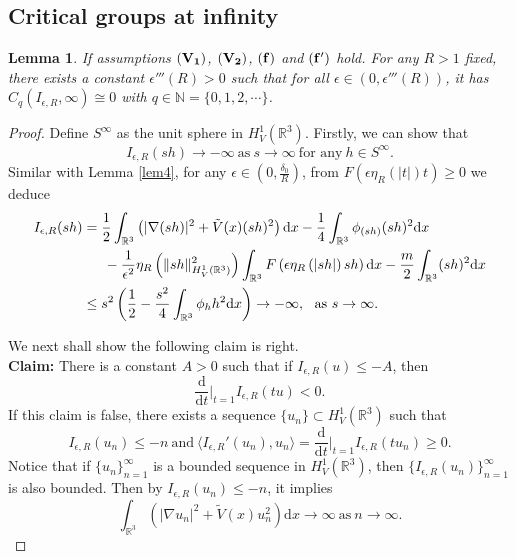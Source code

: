\documentclass[12pt]{amsart}
\numberwithin{equation}{section}
\newtheorem{lemma}[theorem]{Lemma}
\theoremstyle{definition}
\begin{document}
\subsection{Critical groups at infinity}
\begin{lemma}\label{lem6}
If assumptions ${\bf (V_1)}$, ${\bf (V_2)}$, ${\bf (f)}$ and ${\bf (f')}$ hold. For any $R>1$ fixed, there exists a constant $\epsilon'''(R)>0$ such that for all $\epsilon\in(0,\epsilon'''(R))$, it has $C_{q}(I_{\epsilon,R},\infty)\cong0$ with $q\in \mathbb{N}=\{0,1,2,\cdots\}$.
\end{lemma}
\begin{proof}
Define $S^{\infty}$ as the unit sphere in $H^{1}_{V}(\mathbb{R}^3)$. Firstly, we can show that
\begin{equation}\label{eq25}
I_{\epsilon,R}(sh)\to-\infty \ \mbox{as}\ s\to\infty \ \mbox{for any}\ h\in S^{\infty}.
\end{equation}
Similar with Lemma \ref{lem4}, for any $\epsilon\in (0,\frac{\delta_0}{R})$, from $F\left (\epsilon \eta _{R} \left ( \left | t\right |\right )t\right )\geq 0$ we deduce
\begin{equation*}
		\begin{split}
		I_{\epsilon,R}(sh)&=\frac{1}{2}\int_{\mathbb{R}^3}\left(|\nabla (sh)|^{2}+\tilde V(x)(sh)^{2}\right)\text{d}x-\frac{1}{4}\int_{\mathbb{R}^3}\phi_{(sh)}(sh)^{2}\text{d}x\\
		&\indent-\frac{1}{\epsilon^2}\eta _{R}\left (\|sh\|^{2}_{H^1_{V}(\mathbb{R}^3)}\right )\int_{\mathbb{R}^{3}}F\left (\epsilon \eta _{R} \left ( \left | sh\right |\right )sh\right )\text{d}x-\frac{m}{2}\int_{\mathbb{R}^3}(sh)^{2}\text{d}x\\
		&\leq s^{2}\left(\frac{1}{2}-\frac{s^2}{4}\int_{\mathbb{R}^3}\phi_{h}h^{2}\text{d}x\right)\to-\infty,~~\text{as}~s\to\infty.
	\end{split}\end{equation*}
	
We next shall show the following claim is right.\\
{\bf Claim:} There is a constant $A>0$ such that if $I_{\epsilon,R}(u)\leq-A$, then
$$\frac{\mbox{d}}{\mbox{d}t}|_{t=1}I_{\epsilon,R}(t u)<0.$$
If this claim is false, there exists a sequence $\{u_n\}\subset H^{1}_{V}(\mathbb{R}^3)$ such that
\begin{equation}\label{eq26}
I_{\epsilon,R}(u_n)\leq-n\ \mbox{and}\ \langle I_{\epsilon,R}'(u_n),u_n\rangle=\frac{\mbox{d}}{\mbox{d}t}|_{t=1}I_{\epsilon,R}(t u_n)\geq0.
\end{equation}
Notice that if $\{u_{n}\}_{n=1}^\infty$ is a bounded sequence in $H^{1}_{V}(\mathbb{R}^3)$, then $\{I_{\epsilon,R}(u_{n})\}_{n=1}^{\infty}$ is also bounded. Then by $I_{\epsilon,R}(u_n)\leq -n$, it implies
$$\int_{\mathbb{R}^3}\left(|\nabla u_n|^2+\widetilde{V}(x)u_n^{2}\right)\text{d}x\to\infty \ \mbox{as}\ n\to\infty.$$


\end{proof}
\end{document}
